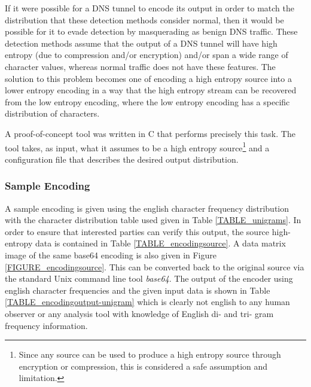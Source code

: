 \documentclass[12pt]{article}
\theoremstyle{remark}
\theoremstyle{definition}
\theoremstyle{definition}
\theoremstyle{definition}
\begin{document}
If it were possible for a DNS tunnel to encode its output in order to match the distribution that these detection methods consider normal, then it would be possible for it to evade detection by masquerading as benign DNS traffic. These detection methods assume that the output of a DNS tunnel will have high entropy (due to compression and/or encryption) and/or span a wide range of character values, whereas normal traffic does not have these features. The solution to this problem becomes one of encoding a high entropy source into a lower entropy encoding in a way that the high entropy stream can be recovered from the low entropy encoding, where the low entropy encoding has a specific distribution of characters.

A proof-of-concept tool was written in C that performs precisely this task. The tool takes, as input, what it assumes to be a high entropy source\footnote{Since any source can be used to produce a high entropy source through encryption or compression, this is considered a safe assumption and limitation.} and a configuration file that describes the desired output distribution.

\subsubsection{Sample Encoding}
A sample encoding is given using the english character frequency distribution with the character distribution table used given in Table \ref{TABLE_unigrams}. In order to ensure that interested parties can verify this output, the source high-entropy data is contained in Table \ref{TABLE_encodingsource}. A data matrix image of the same base64 encoding is also given in Figure \ref{FIGURE_encodingsource}. This can be converted back to the original source via the standard Unix command line tool \emph{base64}. The output of the encoder using english character frequencies and the given input data is shown in Table \ref{TABLE_encodingoutput-unigram} which is clearly not english to any human observer or any analysis tool with knowledge of English di- and tri- gram frequency information.
\end{document}
